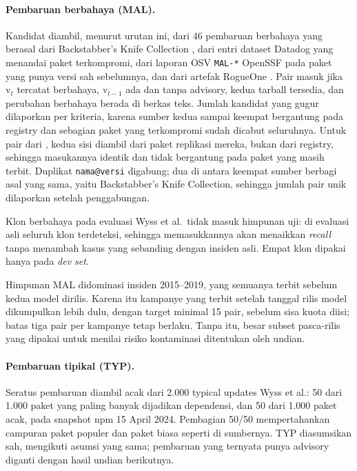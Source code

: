 \documentclass[a4paper,fleqn]{cas-dc}
\begin{document}
\paragraph{Pembaruan berbahaya (MAL).}
Kandidat diambil, menurut urutan ini, dari 46 pembaruan berbahaya
\citet{wyss2025evaluating} yang berasal dari Backstabber's Knife Collection
\citep{ohm2020backstabber}, dari entri dataset Datadog yang menandai paket
terkompromi, dari laporan OSV \texttt{MAL-*} OpenSSF pada paket yang punya
versi sah sebelumnya, dan dari artefak RogueOne \citep{sofaer2024rogueone}.
Pair masuk jika $\mathrm{v}_t$ tercatat berbahaya, $\mathrm{v}_{t-1}$ ada dan
tanpa advisory, kedua tarball tersedia, dan perubahan berbahaya berada di
berkas teks. Jumlah kandidat yang gugur dilaporkan per kriteria, karena sumber
kedua sampai keempat bergantung pada registry dan sebagian paket yang
terkompromi sudah dicabut seluruhnya. Untuk pair dari \citet{wyss2025evaluating},
kedua sisi diambil dari paket replikasi mereka, bukan dari registry, sehingga
masukannya identik dan tidak bergantung pada paket yang masih terbit.
Duplikat \texttt{nama@versi} digabung; dua di antara keempat sumber berbagi asal
yang sama, yaitu Backstabber's Knife Collection, sehingga jumlah pair unik
dilaporkan setelah penggabungan.

Klon berbahaya pada evaluasi Wyss et al.\ tidak masuk himpunan uji: di
evaluasi asli seluruh klon terdeteksi, sehingga memasukkannya akan menaikkan
\emph{recall} tanpa menambah kasus yang sebanding dengan insiden asli. Empat
klon dipakai hanya pada \emph{dev set}.

Himpunan MAL didominasi insiden 2015--2019, yang semuanya terbit sebelum kedua
model dirilis. Karena itu kampanye yang terbit setelah tanggal rilis model
dikumpulkan lebih dulu, dengan target minimal 15 pair, sebelum sisa kuota diisi;
batas tiga pair per kampanye tetap berlaku. Tanpa itu, besar subset pasca-rilis
yang dipakai untuk menilai risiko kontaminasi ditentukan oleh undian.

\paragraph{Pembaruan tipikal (TYP).}
Seratus pembaruan diambil acak dari 2.000 typical updates Wyss et al.: 50 dari
1.000 paket yang paling banyak dijadikan dependensi, dan 50 dari 1.000 paket
acak, pada snapshot npm 15 April 2024. Pembagian 50/50 mempertahankan campuran
paket populer dan paket biasa seperti di sumbernya. TYP diasumsikan sah,
mengikuti asumsi yang sama; pembaruan yang ternyata punya advisory diganti
dengan hasil undian berikutnya.
\end{document}

